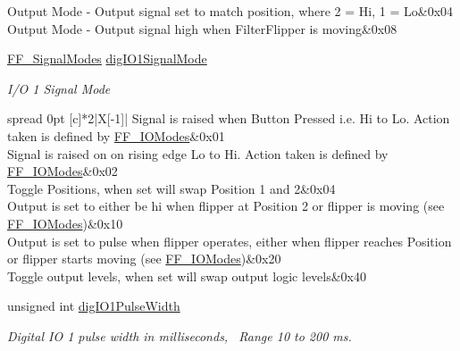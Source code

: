 \begin{DoxyCompactItemize}
\begin{DoxyCompactList}
\begin{longtabu}
Output Mode -\/ Output signal set to match position, where 2 = Hi, 1 = Lo&0x04 \\
Output Mode -\/ Output signal high when Filter\+Flipper is moving&0x08 \\
\end{longtabu}
\end{DoxyCompactList}\item 
\hyperlink{group___filter_flipper_ga0049497885ad3480ad2ccbb1d354809a}{F\+F\+\_\+\+Signal\+Modes} \hyperlink{struct_f_f___i_o_settings_a85757a1c3072fddd1c4793d487196867}{dig\+I\+O1\+Signal\+Mode}
\begin{DoxyCompactList}\small\item\em I/O 1 Signal Mode \tabulinesep=1mm
\begin{longtabu} spread 0pt [c]{*2{|X[-1]}|}
\hline
Signal is raised when Button Pressed i.\+e. Hi to Lo. Action taken is defined by \hyperlink{group___filter_flipper_ga3f9223ae197e5703d709034a238d3925}{F\+F\+\_\+\+I\+O\+Modes}&0x01 \\
Signal is raised on on rising edge Lo to Hi. Action taken is defined by \hyperlink{group___filter_flipper_ga3f9223ae197e5703d709034a238d3925}{F\+F\+\_\+\+I\+O\+Modes}&0x02 \\
Toggle Positions, when set will swap Position 1 and 2&0x04 \\
Output is set to either be hi when flipper at Position 2 or flipper is moving (see \hyperlink{group___filter_flipper_ga3f9223ae197e5703d709034a238d3925}{F\+F\+\_\+\+I\+O\+Modes})&0x10 \\
Output is set to pulse when flipper operates, either when flipper reaches Position or flipper starts moving (see \hyperlink{group___filter_flipper_ga3f9223ae197e5703d709034a238d3925}{F\+F\+\_\+\+I\+O\+Modes})&0x20 \\
Toggle output levels, when set will swap output logic levels&0x40 \\
\end{longtabu}
\end{DoxyCompactList}\item 
unsigned int \hyperlink{struct_f_f___i_o_settings_a63ea8fb4a80096fa5a8dc00506a0a7c0}{dig\+I\+O1\+Pulse\+Width}
\begin{DoxyCompactList}\small\item\em Digital IO 1 pulse width in milliseconds,~\newline
 Range 10 to 200 ms. \end{DoxyCompactList}\item 

\end{DoxyCompactItemize}
